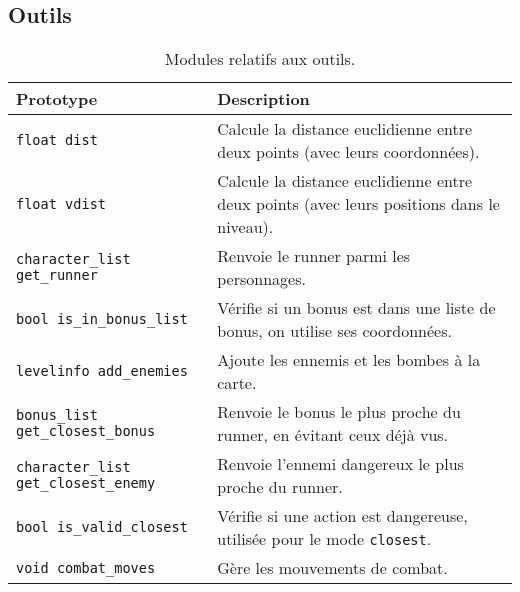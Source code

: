 \subsection{Outils}

\begin{table}[!htpb]
    \label{tab:modules-tools}
    \begin{tabularx}{\textwidth}{lX}
        \toprule
        \textbf{Prototype} & \textbf{Description} \\
        \midrule
        \texttt{float dist} & Calcule la distance euclidienne entre deux points (avec leurs coordonnées). \\
        \texttt{float vdist} & Calcule la distance euclidienne entre deux points (avec leurs positions dans le niveau). \\
        \texttt{character\_list get\_runner} & Renvoie le runner parmi les personnages. \\
        \texttt{bool is\_in\_bonus\_list} & Vérifie si un bonus est dans une liste de bonus, on utilise ses coordonnées. \\
        \texttt{levelinfo add\_enemies} & Ajoute les ennemis et les bombes à la carte. \\
        \texttt{bonus\_list get\_closest\_bonus} & Renvoie le bonus le plus proche du runner, en évitant ceux déjà vus. \\
        \texttt{character\_list get\_closest\_enemy} & Renvoie l'ennemi dangereux le plus proche du runner. \\
        \texttt{bool is\_valid\_closest} & Vérifie si une action est dangereuse, utilisée pour le mode \texttt{closest}. \\
        \texttt{void combat\_moves} & Gère les mouvements de combat. \\
        \bottomrule
    \end{tabularx}
    \caption{Modules relatifs aux outils.}
\end{table}
